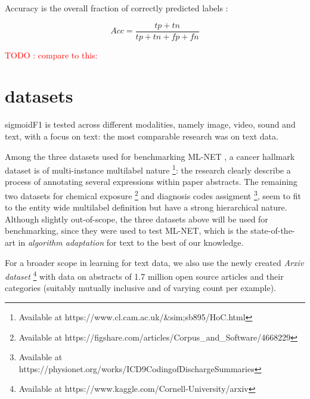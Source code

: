 \documentclass[sigconf,natbib,screen=true,review=true,anonymous]{acmart}
\newcommand\todo[1]{\textcolor{red}{TODO : #1}}
\newcommand\doubt[1]{\textcolor{orange}{DOUBT : #1}}
\begin{document}
Accuracy is the overall fraction of correctly predicted labels \cite{threshForF1}:

$$
A c c=\frac{t p+t n}{t p+t n+f p+f n}
$$




\todo{compare to this:} \cite{lossComp}



\section{datasets}
\label{sec:orgb44ba25}

sigmoidF1 is tested across different modalities, namely image, video, sound and text, with a focus on text: the most comparable research was on text data.



Among the three datasets used for benchmarking ML-NET \cite{multitaskLabel}, a cancer hallmark dataset is of multi-instance multilabel nature \cite{cancerHallmarks} \footnote{Available at https://www.cl.cam.ac.uk/&sim;sb895/HoC.html}: the research clearly describe a process of annotating several expressions within paper abstracts. The remaining two datasets for chemical exposure \cite{chemExposure} \footnote{Available at https://figshare.com/articles/Corpus_and_Software/4668229} and diagnosis codes assigment \cite{diagnosisCode} \footnote{Available at https://physionet.org/works/ICD9CodingofDischargeSummaries}, seem to fit to the entity wide multilabel definition but have a strong hierarchical nature. Although slightly out-of-scope, the three datasets above will be used for benchmarking, since they were used to test ML-NET, which is the state-of-the-art in \emph{algorithm adaptation} for text to the best of our knowledge.

For a broader scope in learning for text data, we also use the newly created \emph{Arxiv dataset} \footnote{Available at https://www.kaggle.com/Cornell-University/arxiv} with data on abstracts of 1.7 million open source articles and their categories (suitably mutually inclusive and of varying count per example).
\end{document}
